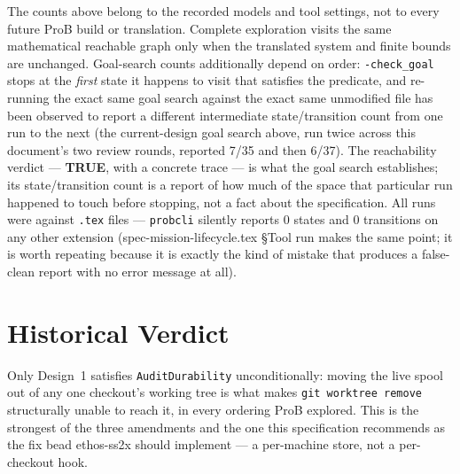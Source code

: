 \documentclass[a4paper,10pt,fleqn]{article}
\newcommand{\fpath}[1]{\nolinkurl{#1}}
\newcommand{\field}[1]{\ifmmode\texttt{#1}\else\texorpdfstring{\breakfield{#1}}{#1}\fi}
\begin{document}
The counts above belong to the recorded models and tool settings, not
to every future ProB build or translation. Complete exploration visits
the same mathematical reachable graph only when the translated system
and finite bounds are unchanged. Goal-search
counts additionally depend on order: \fpath{-check_goal} stops at the \emph{first} state it
happens to visit that satisfies the predicate, and re-running the exact
same goal search against the exact same unmodified file has been
observed to report a different intermediate state/transition count from
one run to the next (the current-design goal search above, run twice
across this document's two review rounds, reported 7/35 and then 6/37).
The reachability verdict --- \textbf{TRUE}, with a concrete trace ---
is what the goal search establishes; its state/transition count is a
report of how much of the space that particular run happened to touch
before stopping, not a fact about the specification. All runs were
against \fpath{.tex} files --- \texttt{probcli} silently reports 0 states
and 0 transitions on any other extension (spec-mission-lifecycle.tex \S Tool
run makes the same point; it is worth repeating because it is exactly the
kind of mistake that produces a false-clean report with no error message
at all).

\section{Historical Verdict}
\label{sec:verdict}

Only Design~1 satisfies \field{AuditDurability} unconditionally: moving the
live spool out of any one checkout's working tree is what makes
\fpath{git worktree remove} structurally unable to reach it, in every
ordering ProB explored. This is the strongest of the three amendments and
the one this specification recommends as the fix bead ethos-ss2x should
implement --- a per-machine store, not a per-checkout hook.
\end{document}
